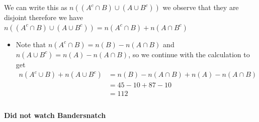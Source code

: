 \documentclass[11pt]{book}
\begin{document}
We can write this as $n\left(\left( A^{c} \cap B \right) \cup \left( A\cup B^{c}  \right) \right) $ we observe that they are disjoint therefore we have $n\left(\left( A^{c} \cap B \right) \cup \left( A\cup B^{c}  \right) \right) = n\left(A^{c} \cap B\right)  + n\left(A \cap B^{c} \right) $ 
\begin{itemize}
    \item Note that $n\left(A^{c} \cap B\right) = n\left(B\right)  - n\left(A\cap B\right) $ and $n\left(A\cup B^{c} \right) = n\left(A\right)  - n\left(A\cap B\right) $, so we continue with the calculation to get
        \begin{align*}
            n\left(A^{c} \cup B\right)  + n\left(A\cup B^{c} \right) &= n\left(B\right)  - n\left(A\cap B\right)  + n\left(A\right)  - n\left(A\cap B\right)   \\ 
            &= 45  - 10  + 87  - 10  \\ 
            &= 112  \\ 
        \end{align*}
\end{itemize}

\paragraph{Did not watch Bandersnatch} 




\end{document}
